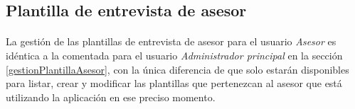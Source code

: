 \subsection{Plantilla de entrevista de asesor}

  \paragraph{}La gestión de las plantillas de entrevista de asesor para el
  usuario \textit{Asesor} es idéntica a la comentada para el usuario
  \textit{Administrador principal} en la sección \ref{gestionPlantillaAsesor},
  con la única diferencia de que solo estarán disponibles para listar, crear y
  modificar las plantillas que pertenezcan al asesor que está utilizando la
  aplicación en ese preciso momento.